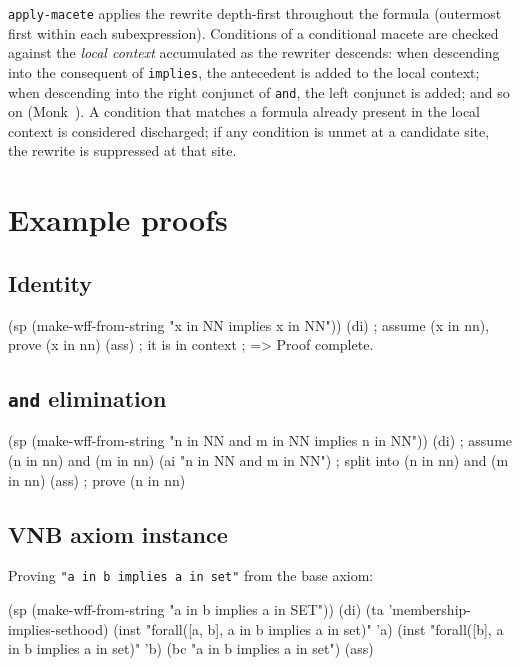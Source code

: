 \begin{remark}
\texttt{apply-macete} applies the rewrite depth-first throughout the
formula (outermost first within each subexpression).  Conditions of a
conditional macete are checked against the \emph{local context}
accumulated as the rewriter descends: when descending into the
consequent of \texttt{implies}, the antecedent is added to the local
context; when descending into the right conjunct of \texttt{and}, the
left conjunct is added; and so on (Monk~\cite{Monk1988}).  A condition that
matches a formula already present in the local context is considered
discharged; if any condition is unmet at a candidate site, the rewrite
is suppressed at that site.
\end{remark}

\section{Example proofs}

\subsection{Identity}

\begin{VNBcode}
(sp (make-wff-from-string "x in NN implies x in NN"))
(di)    ; assume (x in nn), prove (x in nn)
(ass)   ; it is in context
; => Proof complete.
\end{VNBcode}

\subsection{\texttt{and} elimination}

\begin{VNBcode}
(sp (make-wff-from-string "n in NN and m in NN implies n in NN"))
(di)                          ; assume (n in nn) and (m in nn)
(ai "n in NN and m in NN")   ; split into (n in nn) and (m in nn)
(ass)                         ; prove (n in nn)
\end{VNBcode}

\subsection{VNB axiom instance}

Proving \texttt{"a in b implies a in set"} from the base axiom:

\begin{VNBcode}
(sp (make-wff-from-string "a in b implies a in SET"))
(di)
(ta 'membership-implies-sethood)
(inst "forall([a, b], a in b implies a in set)" 'a)
(inst "forall([b], a in b implies a in set)" 'b)
(bc "a in b implies a in set")
(ass)
\end{VNBcode}

